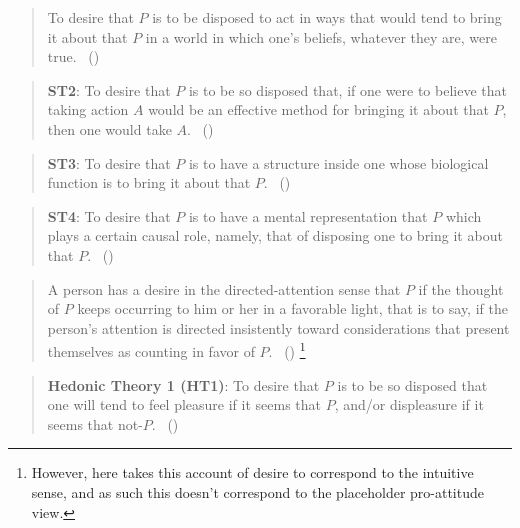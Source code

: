 \documentclass[10pt]{article}
\begin{document}
\begin{quote}
  To desire that \(P\) is to be disposed to act in ways that would tend to bring it about that \(P\) in a world in which one's beliefs, whatever they are, were true.\nolinebreak
  \mbox{ }\hfill(\citeyear[15]{Stalnaker:1984aa})
\end{quote}

\begin{quote}
  \textbf{ST2}:
  To desire that \(P\) is to be so disposed that, if one were to believe that taking action \(A\) would be an effective method for bringing it about that \(P\), then one would take \(A\).\nolinebreak
  \mbox{ }\hfill(\citeyear[17]{Schroeder:2004aa})
\end{quote}

\begin{quote}
  \textbf{ST3}:
  To desire that \(P\) is to have a structure inside one whose biological function is to bring it about that \(P\).\nolinebreak
  \mbox{ }\hfill(\citeyear[18]{Schroeder:2004aa})
\end{quote}

\begin{quote}
  \textbf{ST4}:
  To desire that \(P\) is to have a mental representation that \(P\) which plays a certain causal role, namely, that of disposing one to bring it about that \(P\).\nolinebreak
  \mbox{ }\hfill(\citeyear[24]{Schroeder:2004aa})
\end{quote}

\begin{quote}
  A person has a desire in the directed-attention sense that \(P\) if the thought of \(P\) keeps occurring to him or her in a favorable light, that is to say, if the person’s attention is directed insistently toward considerations that present themselves as counting in favor of \(P\).\nolinebreak
  \mbox{ }\hfill(\cite[39]{Scanlon:1998aa})\nolinebreak
  \footnote{
    However, here \citeauthor{Scanlon:1998aa} takes this account of desire to correspond to the intuitive sense, and as such this doesn't correspond to the placeholder pro-attitude view.
  }
\end{quote}


\begin{quote}
  \textbf{Hedonic Theory 1 (HT1)}:
  To desire that \(P\) is to be so disposed that one will tend to feel pleasure if it seems that \(P\), and/or displeasure if it seems that not-\(P\).\nolinebreak
  \mbox{ }\hfill(\citeyear[27]{Schroeder:2004aa})
\end{quote}
\end{document}
